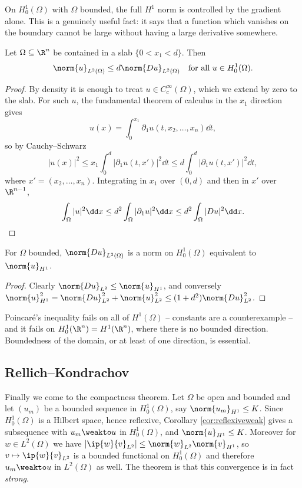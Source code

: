 On $H_0^1(\Omega)$ with $\Omega$ bounded, the full $H^1$ norm is controlled by the gradient alone. This is a genuinely useful fact: it says that a function which vanishes on the boundary cannot be large without having a large derivative somewhere.

\begin{theorem}[Poincar\'e]\label{thm:poincare}
	Let $\Omega\subseteq\R^n$ be contained in a slab $\{0<x_1<d\}$. Then
	$$\norm{u}_{L^2(\Omega)}\le d\norm{Du}_{L^2(\Omega)} \quad \text{for all } u \in H_0^1(\Omega).$$
\end{theorem}

\begin{proof}
	By density it is enough to treat $u \in C_c^\infty(\Omega)$, which we extend by zero to the slab. For such $u$, the fundamental theorem of calculus in the $x_1$ direction gives
	$$u(x)=\int_0^{x_1}\partial_1u(t,x_2,\dots,x_n)\dd t,$$
	so by Cauchy--Schwarz
	$$|u(x)|^2\le x_1\int_0^{d}|\partial_1u(t,x')|^2\dd t \le d\int_0^d|\partial_1u(t,x')|^2\dd t,$$
	where $x'=(x_2,\dots,x_n)$. Integrating in $x_1$ over $(0,d)$ and then in $x'$ over $\R^{n-1}$,
	$$\int_\Omega|u|^2\dd x \le d^2\int_\Omega|\partial_1u|^2\dd x\le d^2\int_\Omega|Du|^2\dd x. \qedhere$$
\end{proof}

\begin{corollary}\label{cor:equivnorm}
	For $\Omega$ bounded, $\norm{Du}_{L^2(\Omega)}$ is a norm on $H_0^1(\Omega)$ equivalent to $\norm{u}_{H^1}$.
\end{corollary}

\begin{proof}
	Clearly $\norm{Du}_{L^2}\le\norm{u}_{H^1}$, and conversely $\norm{u}^2_{H^1}=\norm{Du}^2_{L^2}+\norm{u}^2_{L^2}\le(1+d^2)\norm{Du}^2_{L^2}$.
\end{proof}

Poincar\'e's inequality fails on all of $H^1(\Omega)$ -- constants are a counterexample -- and it fails on $H_0^1(\R^n)=H^1(\R^n)$, where there is no bounded direction. Boundedness of the domain, or at least of one direction, is essential.

\subsection{Rellich--Kondrachov}

Finally we come to the compactness theorem. Let $\Omega$ be open and bounded and let $(u_m)$ be a bounded sequence in $H_0^1(\Omega)$, say $\norm{u_m}_{H^1}\le K$. Since $H_0^1(\Omega)$ is a Hilbert space, hence reflexive, Corollary \ref{cor:reflexiveweak} gives a subsequence with $u_m\weakto u$ in $H_0^1(\Omega)$, and $\norm{u}_{H^1}\le K$. Moreover for $w \in L^2(\Omega)$ we have $|\ip{w}{v}_{L^2}|\le\norm{w}_{L^2}\norm{v}_{H^1}$, so $v \mapsto \ip{w}{v}_{L^2}$ is a bounded functional on $H_0^1(\Omega)$ and therefore $u_m\weakto u$ in $L^2(\Omega)$ as well. The theorem is that this convergence is in fact \emph{strong}.

